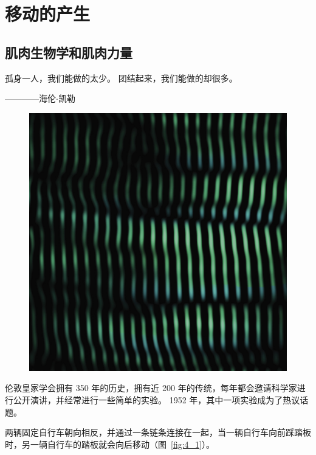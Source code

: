 \part{移动的产生}

\chapter{肌肉生物学和肌肉力量}\label{chap:chap4}


孤身一人，我们能做的太少。
团结起来，我们能做的却很多。
\begin{flushright}
	————海伦$\cdot$凯勒
\end{flushright}


\begin{figure}[!htb]
	\centering
	\includegraphics[width=1.0\linewidth]{chap4/4_0}
	\caption*{ \label{fig:4_0}}
\end{figure}


伦敦皇家学会拥有 350 年的历史，拥有近 200 年的传统，每年都会邀请科学家进行公开演讲，并经常进行一些简单的实验。
1952 年，其中一项实验成为了热议话题。


两辆固定自行车朝向相反，并通过一条链条连接在一起，当一辆自行车向前踩踏板时，另一辆自行车的踏板就会向后移动（图~\ref{fig:4_1}）。


